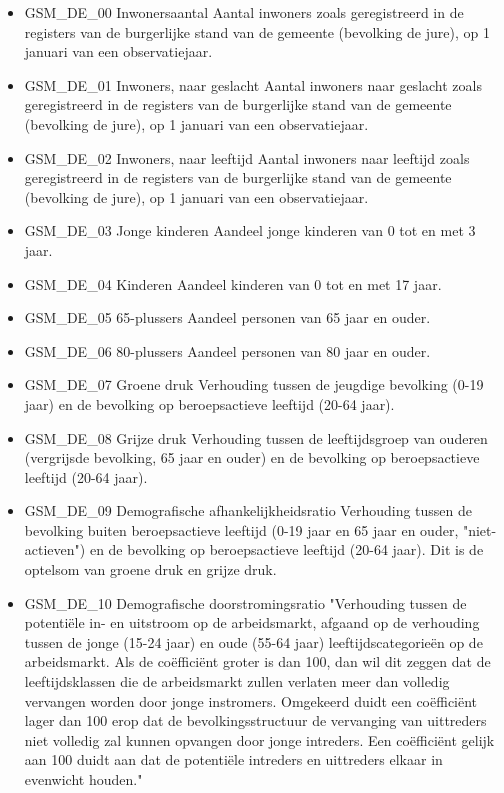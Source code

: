 \documentclass{SVnote}
\begin{document}
\begin{itemize}
\item GSM\_DE\_00	Inwonersaantal		Aantal inwoners zoals geregistreerd in de registers van de burgerlijke stand van de gemeente (bevolking de jure), op 1 januari van een observatiejaar.
\item GSM\_DE\_01	Inwoners, naar geslacht		Aantal inwoners naar geslacht zoals geregistreerd in de registers van de burgerlijke stand van de gemeente (bevolking de jure), op 1 januari van een observatiejaar.
\item GSM\_DE\_02	Inwoners, naar leeftijd		Aantal inwoners naar leeftijd zoals geregistreerd in de registers van de burgerlijke stand van de gemeente (bevolking de jure), op 1 januari van een observatiejaar.
\item GSM\_DE\_03	Jonge kinderen		Aandeel jonge kinderen van 0 tot en met 3 jaar.
\item GSM\_DE\_04	Kinderen		Aandeel kinderen van 0 tot en met 17 jaar.
\item GSM\_DE\_05	65-plussers		Aandeel personen van 65 jaar en ouder.
\item GSM\_DE\_06	80-plussers		Aandeel personen van 80 jaar en ouder.
\item GSM\_DE\_07	Groene druk		Verhouding tussen de jeugdige bevolking (0-19 jaar) en de bevolking op beroepsactieve leeftijd (20-64 jaar).
\item GSM\_DE\_08	Grijze druk		Verhouding tussen de leeftijdsgroep van ouderen (vergrijsde bevolking, 65 jaar en ouder) en de bevolking op beroepsactieve leeftijd (20-64 jaar).
\item GSM\_DE\_09	Demografische afhankelijkheidsratio		Verhouding tussen de bevolking buiten beroepsactieve leeftijd (0-19 jaar en 65 jaar en ouder, "niet-actieven") en de bevolking op beroepsactieve leeftijd (20-64 jaar). Dit is de optelsom van groene druk en grijze druk.
\item GSM\_DE\_10	Demografische doorstromingsratio		"Verhouding tussen de potentiële in- en uitstroom op de arbeidsmarkt, afgaand op de verhouding tussen de jonge (15-24 jaar) en oude (55-64 jaar) leeftijdscategorieën op de arbeidsmarkt.
Als de coëfficiënt groter is dan 100, dan wil dit zeggen dat de leeftijdsklassen die de arbeidsmarkt zullen verlaten meer dan volledig vervangen worden door jonge instromers. Omgekeerd duidt een coëfficiënt lager dan 100 erop dat de bevolkingsstructuur de vervanging van uittreders niet volledig zal kunnen opvangen door jonge intreders. Een coëfficiënt gelijk aan 100 duidt aan dat de potentiële intreders en uittreders elkaar in evenwicht houden."

\end{itemize}
\end{document}
